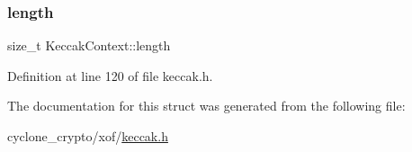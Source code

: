 \subsubsection{\texorpdfstring{length}{length}}
{\footnotesize\ttfamily size\+\_\+t Keccak\+Context\+::length}



Definition at line 120 of file keccak.\+h.



The documentation for this struct was generated from the following file\+:\begin{DoxyCompactItemize}
\item 
cyclone\+\_\+crypto/xof/\hyperlink{keccak_8h}{keccak.\+h}\end{DoxyCompactItemize}
